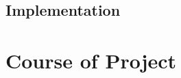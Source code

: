 \documentclass{article}
\newcommand\mycom[1]{}
\newcommand\mycom[1]{#1}
\newcommand{\jw}[1]{\mycom{\todo[color=blue!40,inline]{\small JW: #1}}}
\begin{document}
\subsection{Implementation}
\jw{How to use them with CEGAAR loop in Ultimate \\ Question: How do we implement CEGAAR in Ultimate? \\ Predicate Abstraction, Trace Abstraction, SIFA, mega abstraction?}
\pagebreak
\section{Course of Project}
\jw{Section about timetable and so on. \\ What to do and when.}	



	
\end{document}
